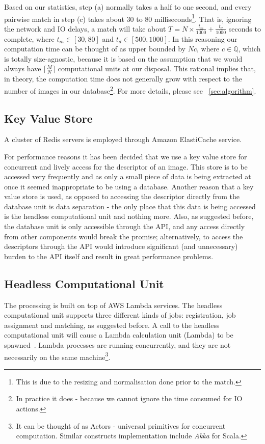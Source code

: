 Based on our statistics, step (a) normally takes a half to one second, and every pairwise match in step (c) takes about 30 to 80 milliseconds\footnote{This is due to the resizing and normalisation done prior to the match.}. That is, ignoring the network and IO delays, a match will take about $T = N \times \frac{t_m}{1000} + \frac{t_d}{1000}$ seconds to complete, where $t_m \in [30, 80]$ and $t_d \in [500, 1000]$. In this reasoning our computation time can be thought of as upper bounded by $Nc$, where $c \in \mathbb{Q}$, which is totally size-agnostic, because it is based on the assumption that we would always have $\lceil \frac{M}{N} \rceil$ computational units at our disposal. This rational implies that, in theory, the computation time does not generally grow with respect to the number of images in our database\footnote{In practice it does - because we cannot ignore the time consumed for IO actions.}. For more details, please see ~\ref{sec:algorithm}.

\subsection{Key Value Store}
A cluster of Redis servers is employed through Amazon ElastiCache service.

For performance reasons it has been decided that we use a key value store for concurrent and lively access for the descriptor of an image. This store is to be accessed very frequently and as only a small piece of data is being extracted at once it seemed inappropriate to be using a database. Another reason that a key value store is used, as opposed to accessing the descriptor directly from the database unit is data separation - the only place that this data is being accessed is the headless computational unit and nothing more. Also, as suggested before, the database unit is only accessible through the API, and any access directly from other components would break the promise; alternatively, to access the descriptors through the API would introduce significant (and unnecessary) burden to the API itself and result in great performance problems.

\subsection{Headless Computational Unit}
\label{sec:lambda}
The processing is built on top of AWS Lambda services. The headless computational unit supports three different kinds of jobs: registration, job assignment and matching, as suggested before. A call to the headless computational unit will cause a Lambda calculation unit (Lambda) to be spawned~\cite{lambda}. Lambda processes are running concurrently, and they are not necessarily on the same machine\footnote{It can be thought of as Actors - universal primitives for concurrent computation. Similar constructs implementation include \textit{Akka} for Scala.}.

